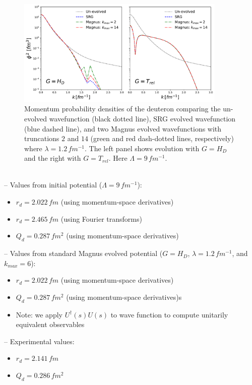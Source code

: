 \documentclass[preprintnumbers,floatfix,aps,prc,preprint,nofootinbib]{revtex4-1}
\begin{document}
\noindent{%
	\textcolor{red}{%
	UPDATED UP TO HERE 04/03/19
	}
}
\\
\begin{figure}
  	\captionsetup{singlelinecheck=false,justification=raggedright}
  	\centering
  	\includegraphics[width=10cm]{momentum_dist_Wendt_Lamb9}
  	\hspace*{0.05\textwidth}
  	\caption{Momentum probability densities of the deuteron comparing the un-evolved wavefunction (black dotted line), SRG evolved wavefunction (blue dashed line), and two Magnus evolved wavefunctions with truncations $2$ and $14$ (green and red dash-dotted lines, respectively) where $\lambda=1.2 \, fm^{-1}$. The left panel shows evolution with $G=H_{D}$ and the right with $G=T_{rel}$. Here $\Lambda=9 \, fm^{-1}$.}
  	\label{fig:momentum_dist_Wendt_Lamb9}
\end{figure}
%
\\
-- Values from initial potential ($\Lambda=9 \, fm^{-1}$):
\begin{itemize}
  	\item $r_d = 2.022 \, fm$ (using momentum-space derivatives)
  	\item $r_d = 2.465 \, fm$ (using Fourier transforms)
	\item $Q_d = 0.287 \, fm^2$ (using momentum-space derivatives)
\end{itemize}
-- Values from standard Magnus evolved potential ($G=H_D$, $\lambda=1.2 \, fm^{-1}$, and $k_{max}=6$):
\begin{itemize}
  	\item $r_d = 2.022 \, fm$ (using momentum-space derivatives)
  	\item $Q_d = 0.287 \, fm^2$ (using momentum-space derivatives)s
  	\item Note: we apply $U^{\dagger}(s) U(s)$ to wave function to compute unitarily equivalent observables
\end{itemize}
-- Experimental values:
\begin{itemize}
  	\item $r_d = 2.141 \, fm$
  	\item $Q_d = 0.286 \, fm^2$
\end{itemize}
\end{document}
